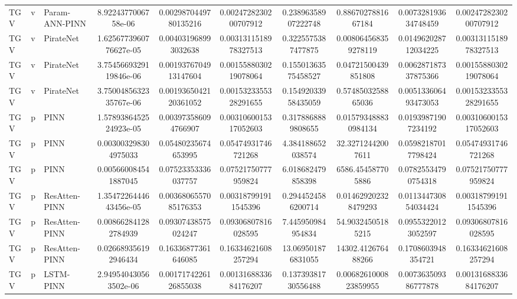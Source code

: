 \begin{landscape}
\begin{longtable}{lllccccccc}
 TGV &     v & Param-ANN-PINN &    8.9224377006758e-06 &  0.0029870449780135216 &  0.0024728230200707912 &  0.23896358907222748 &    0.8867027881667184 &  0.007328193634748459 &  0.0024728230200707912 \\
 TGV &     v &      PirateNet & 1.6256773960776627e-05 &   0.004031968993032638 &  0.0031311518978327513 &   0.3225575387477875 &  0.008064568359278119 &  0.014962028712034225 &  0.0031311518978327513 \\
 TGV &     v &      PirateNet & 3.7545669329119846e-06 &  0.0019376704913147604 &  0.0015588030219078064 &  0.15501363575458527 &   0.04721500439851808 &  0.006287187337875366 &  0.0015588030219078064 \\
 TGV &     v &      PirateNet & 3.7500485632335767e-06 &  0.0019365042120361052 &  0.0015323355328291655 &  0.15492033958435059 &    0.5748503258865036 &  0.005133606493473053 &  0.0015323355328291655 \\
 TGV &     p &           PINN & 1.5789386452524923e-05 &   0.003973586094766907 &  0.0031060015317052603 &   0.3178868889808655 &  0.015793488830984134 &   0.01939871907234192 &  0.0031060015317052603 \\
 TGV &     p &           PINN &   0.003003298304975033 &    0.05480235674653995 &    0.05474931746721268 &    4.384188652038574 &     32.32712442007611 &   0.05982187017798424 &    0.05474931746721268 \\
 TGV &     p &           PINN &   0.005660084541887045 &    0.07523353336037757 &    0.07521750777959824 &    6.018682479858398 &     6586.454587705886 &   0.07825534790754318 &    0.07521750777959824 \\
 TGV &     p &  ResAtten-PINN & 1.3547226444643456e-05 &  0.0036806557085176353 &   0.003187991911545396 &   0.2944524586200714 &  0.014629202328479293 &  0.011344730854034424 &   0.003187991911545396 \\
 TGV &     p &  ResAtten-PINN &   0.008662841282784939 &    0.09307438575024247 &    0.09306807816028595 &    7.445950984954834 &     54.90324505185215 &   0.09553220123052597 &    0.09306807816028595 \\
 TGV &     p &  ResAtten-PINN &   0.026689356192946434 &    0.16336877361646085 &    0.16334621608257294 &   13.069501876831055 &    14302.412676488266 &    0.1708603948354721 &    0.16334621608257294 \\
 TGV &     p &      LSTM-PINN &  2.949540430563502e-06 &  0.0017174226126855038 &  0.0013168833684176207 &  0.13739381730556488 & 0.0068261000823859955 &  0.007363509386777878 &  0.0013168833684176207 \\

\end{longtable}
\end{landscape}
